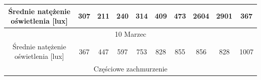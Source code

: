\documentclass[a4paper,12pt]{article}
\begin{document}
\begin{table}[!ht]
\begin{tabular}{|c|c|c|c|c|c|c|c|c|c|}
Średnie natężenie oświetlenia {[}lux{]} & \cellcolor[HTML]{FFCCC9}307                                             & \cellcolor[HTML]{FFCCC9}211                                             & \cellcolor[HTML]{FFCCC9}240                                             & \cellcolor[HTML]{F6E9C3}314                                             & \cellcolor[HTML]{F6E9C3}409                                             & \cellcolor[HTML]{F6E9C3}473                                             & \cellcolor[HTML]{F6E9C3}2604                                            & \cellcolor[HTML]{F6E9C3}2901                                            & \cellcolor[HTML]{FFCCC9}367                                             \\ \hline
\multicolumn{10}{|c|}{10 Marzec}                                                                                                                                                                                                                                                                                                                                                                                                                                                                                                                                                                                                                                                                                                  \\ \hline
Średnie natężenie oświetlenia {[}lux{]} & \cellcolor[HTML]{F6E9C3}367                                             & \cellcolor[HTML]{F6E9C3}447                                             & \cellcolor[HTML]{F6E9C3}597                                             & \cellcolor[HTML]{F6E9C3}753                                             & \cellcolor[HTML]{F6E9C3}828                                             & \cellcolor[HTML]{F6E9C3}855                                             & \cellcolor[HTML]{F6E9C3}856                                             & \cellcolor[HTML]{F6E9C3}828                                             & \cellcolor[HTML]{F6E9C3}1007                                            \\ \hline
\multicolumn{10}{|c|}{\cellcolor[HTML]{B2BFE5}Częściowe zachmurzenie}                                                                                                                                                                                                                                                                                                                                                                                                                                                                                                                                                                                                                                                             \\ \hline

\end{tabular}
\end{table}
\end{document}
